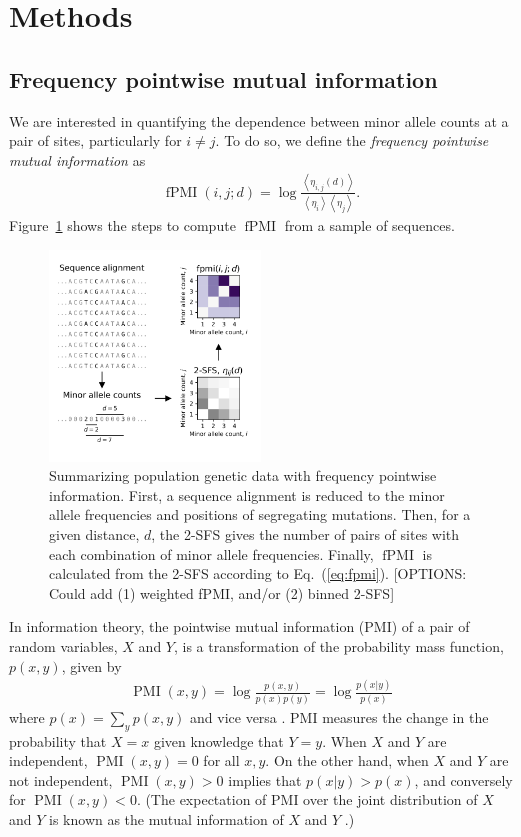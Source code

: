 \documentclass[11pt, letterpaper]{article}   	%
\newcommand{\eq}[1]{Eq.~(\ref{#1})}
\newcommand{\Fig}[1]{Figure~\ref{#1}}
\newcommand{\E}[1]{\left< #1 \right>}
\DeclareMathOperator{\pmi}{PMI}
\DeclareMathOperator{\fpmi}{fPMI}
\begin{document}
\section*{Methods}

\subsection*{Frequency pointwise mutual information}

We are interested in quantifying the dependence between minor allele counts at a pair of sites, particularly for $i\neq j$.
To do so, we define the \textit{frequency pointwise mutual information} as
\begin{align}
    \fpmi(i,j;d) = \log \frac{\E{\eta_{i,j}(d)}}{\E{\eta_i} \E{\eta_j}}.
    \label{eq:fpmi}
\end{align}
\Fig{fig:schematic} shows the steps to compute $\fpmi$ from a sample of sequences.

\begin{figure}
\centering
\includegraphics[width=0.5\textwidth]{figures/schematic.pdf}
\caption{Summarizing population genetic data with frequency pointwise information. First, a sequence alignment is reduced to the minor allele frequencies and positions of segregating mutations. Then, for a given distance, $d$, the 2-SFS gives the number of pairs of sites with each combination of minor allele frequencies. Finally, $\fpmi$ is calculated from the 2-SFS according to \eq{eq:fpmi}.
[OPTIONS: Could add (1) weighted fPMI, and/or (2) binned 2-SFS] \label{fig:schematic}}
\end{figure}

In information theory, the pointwise mutual information (PMI) of a pair of random variables, $X$ and $Y$, is a transformation of the probability mass function, $p(x,y)$, given by
\begin{align}
    \pmi(x,y) = \log \frac{p(x,y)}{p(x)p(y)} = \log \frac{p(x|y)}{p(x)}
    \label{eq:pmi}
\end{align}
where $p(x) = \sum_y p(x,y)$ and vice versa \autocite{ChurchHanks1990}.
PMI measures the change in the probability that $X=x$ given knowledge that $Y=y$.
When $X$ and $Y$ are independent, $\pmi(x,y) = 0$ for all $x,y$.
On the other hand, when $X$ and $Y$ are not independent, $\pmi(x,y) > 0$ implies that $p(x|y) > p(x)$, and conversely for $\pmi(x,y) < 0$.
(The expectation of PMI over the joint distribution of $X$ and $Y$ is known as the mutual information of $X$ and $Y$ \autocite{CoverThomas1991}.)
\end{document}
